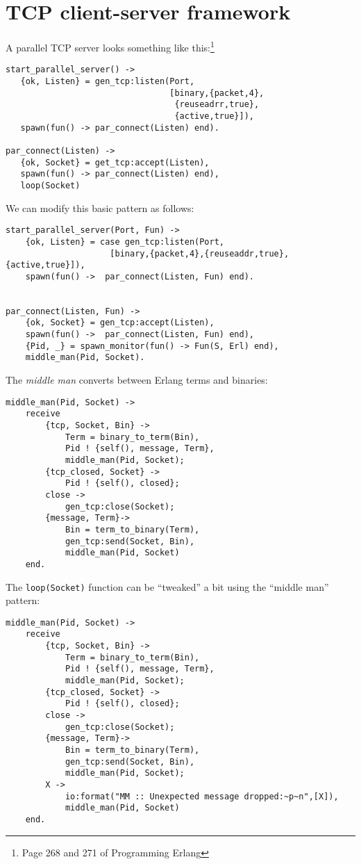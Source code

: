 \documentclass[10pt]{article}
\begin{document}
\section{TCP client-server framework}

A parallel TCP server looks something like this:\footnote{Page 268 and
  271 of Programming Erlang}

\begin{verbatim}
start_parallel_server() ->
   {ok, Listen} = gen_tcp:listen(Port,
                                 [binary,{packet,4},
                                  {reuseadrr,true},
                                  {active,true}]),
   spawn(fun() -> par_connect(Listen) end).

par_connect(Listen) ->
   {ok, Socket} = get_tcp:accept(Listen),
   spawn(fun() -> par_connect(Listen) end),
   loop(Socket)
\end{verbatim}

We can modify this basic pattern as follows:

\begin{verbatim}
start_parallel_server(Port, Fun) ->
    {ok, Listen} = case gen_tcp:listen(Port,
                     [binary,{packet,4},{reuseaddr,true},{active,true}]),
    spawn(fun() ->  par_connect(Listen, Fun) end).


par_connect(Listen, Fun) ->
    {ok, Socket} = gen_tcp:accept(Listen),
    spawn(fun() ->  par_connect(Listen, Fun) end),
    {Pid, _} = spawn_monitor(fun() -> Fun(S, Erl) end),
    middle_man(Pid, Socket).
\end{verbatim}

The {\sl middle man} converts between Erlang terms and binaries:

\begin{verbatim}
middle_man(Pid, Socket) ->
    receive
        {tcp, Socket, Bin} ->
            Term = binary_to_term(Bin),
            Pid ! {self(), message, Term},
            middle_man(Pid, Socket);
        {tcp_closed, Socket} ->
            Pid ! {self(), closed};
        close ->
            gen_tcp:close(Socket);
        {message, Term}->
            Bin = term_to_binary(Term),
            gen_tcp:send(Socket, Bin),
            middle_man(Pid, Socket)
    end.
\end{verbatim}

The \verb+loop(Socket)+ function can be ``tweaked'' a bit using the 
``middle man'' pattern:

\begin{verbatim}
middle_man(Pid, Socket) ->
    receive
        {tcp, Socket, Bin} ->
            Term = binary_to_term(Bin),
            Pid ! {self(), message, Term},
            middle_man(Pid, Socket);
        {tcp_closed, Socket} ->
            Pid ! {self(), closed};
        close ->
            gen_tcp:close(Socket);
        {message, Term}->
            Bin = term_to_binary(Term),
            gen_tcp:send(Socket, Bin),
            middle_man(Pid, Socket);
        X ->
            io:format("MM :: Unexpected message dropped:~p~n",[X]),
            middle_man(Pid, Socket)
    end.
\end{verbatim}
\end{document}
